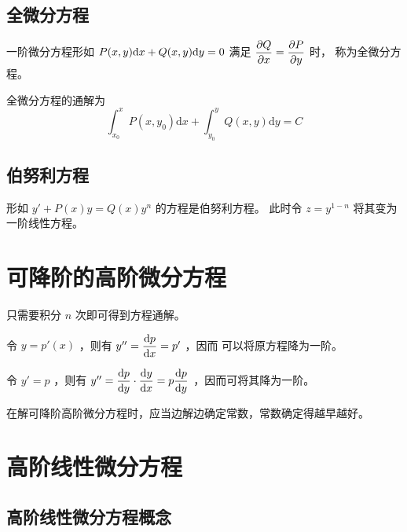 \subsection{全微分方程}

一阶微分方程形如 $ \displaystyle P(x,y)\mathrm{d}x + Q(x,y)\mathrm{d}y = 0 $ 满足
$ \displaystyle \dfrac{\partial Q}{\partial x} = \dfrac{\partial P}{\partial y} $ 时，
称为全微分方程。

全微分方程的通解为$$
    \int_{x_0}^xP(x,y_0)\mathrm{d}x + \int_{y_0}^y Q(x,y)\mathrm{d}y = C
$$ 

\subsection{伯努利方程}

形如 $ y' + P(x)y = Q(x)y^n $ 的方程是伯努利方程。
此时令 $ z = y^{1-n} $ 将其变为一阶线性方程。

\section{可降阶的高阶微分方程}

\begin{Field}[形如 $ y^{(n)} = f(x) $ 时 ]

    只需要积分 $ n $ 次即可得到方程通解。
\end{Field}

\begin{Field}[不显含函数$ y $ 的二阶可降阶方程 $ y^\pprime = f(x,y') $ ]

    令 $ y = p'(x) $ ，则有 $ y^{\prime\prime} = \dfrac{\mathrm{d} p}{\mathrm{d}x}  =p' $ ，因而
    可以将原方程降为一阶。
\end{Field}

\begin{Field}[不显含自变量 $ x $ 的二阶可降阶方程 $  y^\pprime = f(y,y') $ ]

    令 $ y' = p $ ，则有 $ y^{\prime\prime} = \dfrac{\mathrm{d}p}{\mathrm{d}y}\cdot \dfrac{\mathrm{d}y}{\mathrm{d}x}
    =p\dfrac{\mathrm{d}p}{\mathrm{d}y} $ ，因而可将其降为一阶。
\end{Field}

在解可降阶高阶微分方程时，应当边解边确定常数，常数确定得越早越好。

\section{高阶线性微分方程}

\subsection{高阶线性微分方程概念}

